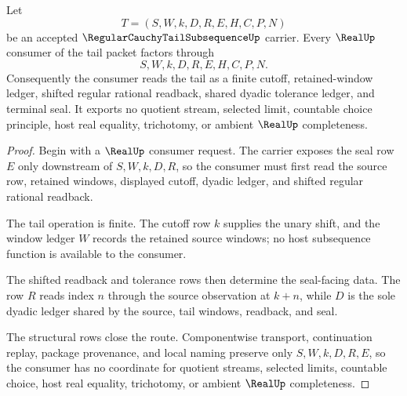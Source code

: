 \begin{theorem}
\label{thm:regular-cauchy-tail-subsequence-real-seal-stability}
Let
$$
T=(S,W,k,D,R,E,H,C,P,N)
$$
be an accepted $\RegularCauchyTailSubsequenceUp$ carrier. Every $\RealUp$ consumer of the tail packet factors through
$$
S,W,k,D,R,E,H,C,P,N.
$$
Consequently the consumer reads the tail as a finite cutoff, retained-window ledger, shifted regular rational readback, shared dyadic tolerance ledger, and terminal seal. It exports no quotient stream, selected limit, countable choice principle, host real equality, trichotomy, or ambient $\RealUp$ completeness.
\end{theorem}
\begin{proof}
Begin with a $\RealUp$ consumer request. The carrier exposes the seal row $E$ only downstream of $S,W,k,D,R$, so the consumer must first read the source row, retained windows, displayed cutoff, dyadic ledger, and shifted regular rational readback.

The tail operation is finite. The cutoff row $k$ supplies the unary shift, and the window ledger $W$ records the retained source windows; no host subsequence function is available to the consumer.

The shifted readback and tolerance rows then determine the seal-facing data. The row $R$ reads index $n$ through the source observation at $k+n$, while $D$ is the sole dyadic ledger shared by the source, tail windows, readback, and seal.

The structural rows close the route. Componentwise transport, continuation replay, package provenance, and local naming preserve only $S,W,k,D,R,E$, so the consumer has no coordinate for quotient streams, selected limits, countable choice, host real equality, trichotomy, or ambient $\RealUp$ completeness.
\end{proof}


